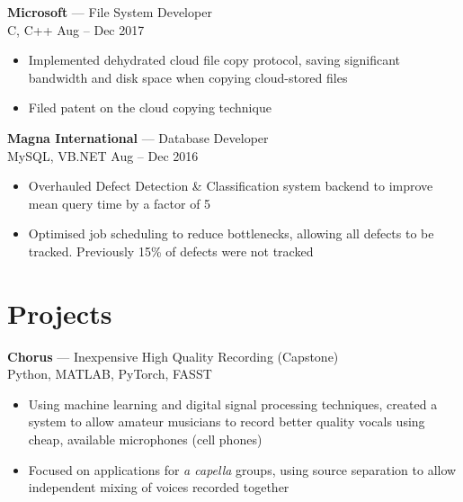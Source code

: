 \documentclass[letterpaper,10pt]{article}
\newcommand{\comment}[1]{}
\newcommand{\jobtitle}[4]{
    {\large \textbf{#1} --- #2\\}
    {\footnotesize#3 \hfill #4}
}
\begin{document}
\begin{minipage}[t]{0.6\textwidth}
\begin{itemize}
\end{itemize}
\bigskip

\jobtitle{Microsoft}{File System Developer}{C, C++ }{Aug -- Dec 2017}
\begin{itemize}
    \item {Implemented dehydrated cloud file copy protocol, saving significant bandwidth and disk space when copying cloud-stored files}
    \item {Filed patent on the cloud copying technique}   %
\end{itemize}
\bigskip

\jobtitle{Magna International}{Database Developer}{MySQL, VB.NET}{Aug -- Dec 2016}
\begin{itemize}
    \item {Overhauled Defect Detection \& Classification system backend to improve mean query time by a factor of 5}
    \item {Optimised job scheduling to reduce bottlenecks, allowing all defects to be tracked. Previously 15\% of defects were not tracked}
\end{itemize}
\bigskip

\section{Projects}
\smallskip
{\large
\textbf{Chorus} --- Inexpensive High Quality Recording (Capstone) \\
}
{\footnotesize
Python, MATLAB, PyTorch, FASST
}
\begin{itemize}
	\item {Using machine learning and digital signal processing techniques, created a system to allow amateur musicians to record better quality vocals using cheap, available microphones (cell phones)}
    \item {Focused on applications for \textit{a capella} groups, using source separation to allow independent mixing of voices recorded together}
\end{itemize}

\bigskip

\comment{todo: MHCT?}

\comment{
{\large
\textbf{UW Autonomous Sailboat Team}\\
}
{\footnotesize
Python
}
\begin{itemize}
	\item {Implemented autonomous path planning software for round-the-buoys races on a 2 metre model sailboat}
    \item {Created automatic sail trim system in hardware}
\end{itemize}
}

\end{minipage}
\end{document}
